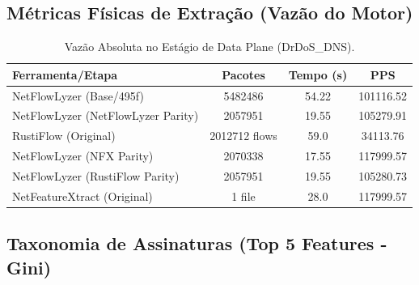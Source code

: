 \documentclass[11pt,a4paper]{article}
\begin{document}
\subsection{Métricas Físicas de Extração (Vazão do Motor)}
\begin{table}[H]
\centering
\begin{threeparttable}
\begin{tabular}{lccc}
\toprule
\textbf{Ferramenta/Etapa} & \textbf{Pacotes} & \textbf{Tempo (s)} & \textbf{PPS} \\
\midrule
NetFlowLyzer (Base/495f) & 5482486 & 54.22 & 101116.52 \\
NetFlowLyzer (NetFlowLyzer Parity) & 2057951 & 19.55 & 105279.91 \\
RustiFlow (Original) & 2012712 flows & 59.0 & 34113.76 \\
NetFlowLyzer (NFX Parity) & 2070338 & 17.55 & 117999.57 \\
NetFlowLyzer (RustiFlow Parity) & 2057951 & 19.55 & 105280.73 \\
NetFeatureXtract (Original) & 1 file & 28.0 & 117999.57 \\
\bottomrule
\end{tabular}
\end{threeparttable}
\caption{Vazão Absoluta no Estágio de Data Plane (DrDoS\_DNS).}
\end{table}

\subsection{Taxonomia de Assinaturas (Top 5 Features - Gini)}
\begin{table}[H]
\centering
{}
\caption{Principais atributos de correlação estocástica por limiar dimensional (DrDoS\_DNS).}
\end{table}
\end{document}
